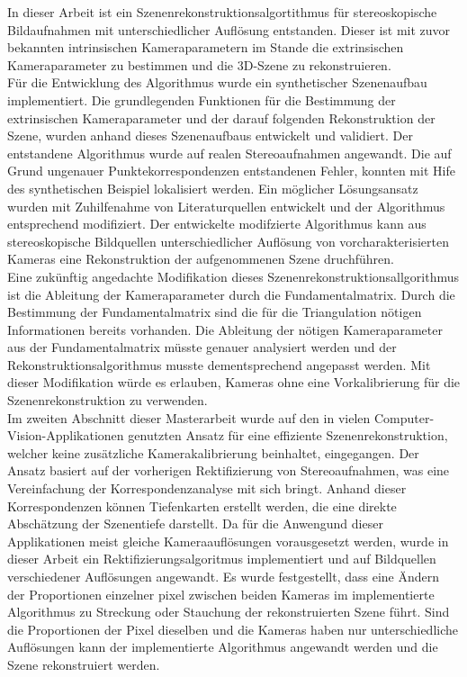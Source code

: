 
In dieser Arbeit ist ein Szenenrekonstruktionsalgortithmus für stereoskopische Bildaufnahmen mit unterschiedlicher Auflösung entstanden. Dieser ist mit zuvor bekannten intrinsischen Kameraparametern im Stande die extrinsischen Kameraparameter zu bestimmen und die 3D-Szene zu rekonstruieren. \\

Für die Entwicklung des Algorithmus wurde ein synthetischer Szenenaufbau implementiert. Die grundlegenden Funktionen für die Bestimmung der extrinsischen Kameraparameter und der darauf folgenden Rekonstruktion der Szene, wurden anhand dieses Szenenaufbaus entwickelt und validiert. Der entstandene Algorithmus wurde auf realen Stereoaufnahmen angewandt. Die auf Grund ungenauer Punktekorrespondenzen entstandenen Fehler, konnten mit Hife des synthetischen Beispiel lokalisiert werden. Ein möglicher Lösungsansatz wurden mit Zuhilfenahme von Literaturquellen entwickelt und der Algorithmus entsprechend modifiziert. Der entwickelte modifzierte Algorithmus kann aus stereoskopische Bildquellen unterschiedlicher Auflösung von vorcharakterisierten Kameras eine Rekonstruktion der aufgenommenen Szene druchführen.  \\

Eine zukünftig angedachte Modifikation dieses Szenenrekonstruktionsallgorithmus ist die Ableitung der Kameraparameter durch die Fundamentalmatrix. Durch die Bestimmung der Fundamentalmatrix sind die für die Triangulation nötigen Informationen bereits vorhanden. Die Ableitung der nötigen Kameraparameter aus der Fundamentalmatrix müsste genauer analysiert werden und der Rekonstruktionsalgorithmus musste dementsprechend angepasst werden. Mit dieser Modifikation würde es erlauben, Kameras ohne eine Vorkalibrierung für die Szenenrekonstruktion zu verwenden. \\

Im zweiten Abschnitt dieser Masterarbeit wurde auf den in vielen Computer-Vision-Applikationen genutzten Ansatz für eine effiziente Szenenrekonstruktion, welcher keine zusätzliche Kamerakalibrierung beinhaltet, eingegangen. Der Ansatz basiert auf der vorherigen Rektifizierung von Stereoaufnahmen, was eine Vereinfachung der Korrespondenzanalyse mit sich bringt. Anhand dieser Korrespondenzen können Tiefenkarten erstellt werden, die eine direkte Abschätzung der Szenentiefe darstellt. Da für die Anwengund dieser Applikationen meist gleiche Kameraauflösungen vorausgesetzt werden, wurde in dieser Arbeit ein Rektifizierungsalgoritmus implementiert und auf Bildquellen verschiedener Auflösungen angewandt. Es wurde festgestellt, dass eine Ändern der Proportionen einzelner pixel zwischen beiden Kameras im implementierte Algorithmus zu Streckung oder Stauchung der rekonstruierten Szene führt. Sind die Proportionen der Pixel dieselben und die Kameras haben nur unterschiedliche Auflösungen kann der implementierte Algorithmus angewandt werden und die Szene rekonstruiert werden. \\

